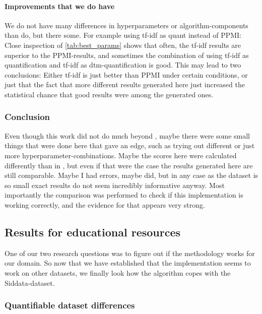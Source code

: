 \paragraph{Improvements that we do have}

We do not have many differences in hyperparameters or algorithm-components than \mainalgos do, but there some. For example using tf-idf as \gls{quant} instead of PPMI: Close inspection of \autoref{tab:best_params} shows that often, the tf-idf results are superior to the PPMI-results, and sometimes the combination of using tf-idf as quantification and tf-idf as dtm-quantification is good. This may lead to two conclusions: Either tf-idf is just better than PPMI under certain conditions, or just that the fact that more different results generated here just increased the statistical chance that good results were among the generated ones.

\subsubsection*{Conclusion} 

Even though this work did not do much beyond \mainalgos, maybe there were some small things that were done here that gave an edge, such as trying out different or just more hyperparameter-combinations. Maybe the scores here were calculated differently than in \mainalgos, but even if that were the case the results generated here are still comparable. Maybe I had errors, maybe \mainalgos did, but in any case as the dataset is so small exact results do not seem incredibly informative anyway. Most importantly the comparison was performed to check if this implementation is working correctly, and the evidence for that appears very strong.

\subsection{Results for educational resources}

One of our two research questions was to figure out if the methodology works for our domain. So now that we have established that the implementation seems to work on other datasets, we finally look how the algorithm copes with the Siddata-dataset.

\subsubsection{Quantifiable dataset differences}
\label{sec:discuss_datasetdiffs}

